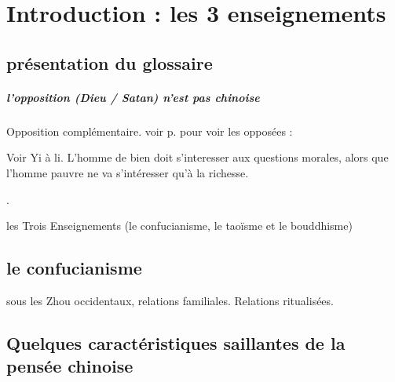 \chapter{Introduction : les 3 enseignements}



\section{présentation du glossaire}
\paragraph{l'opposition (Dieu / Satan) n'est pas chinoise} Opposition complémentaire. 
voir p. \pageref{DefGlossaire} pour voir les opposées : 

\begin{Ex}[Opposition]
    Voir Yi à li. L'homme de bien doit s'interesser aux questions morales, alors que l'homme pauvre ne va s'intéresser qu'à la richesse.
\end{Ex}.

\begin{Def}[Sanjiao 三教]
    les Trois Enseignements (le confucianisme, le taoïsme et le bouddhisme) 
\end{Def}


\section{le confucianisme}

\begin{Def}[rujiao  儒教]
 sous les Zhou occidentaux, relations familiales. Relations ritualisées.    
\end{Def}


\section{Quelques caractéristiques saillantes de la pensée chinoise}

